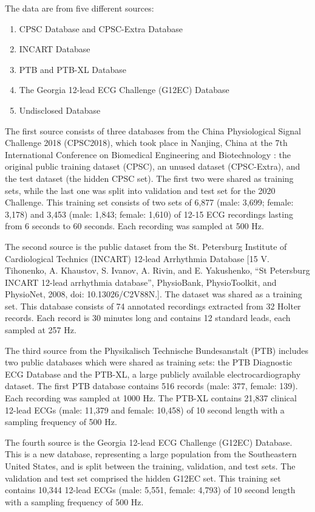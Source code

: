 The data are from five different sources:
\begin{enumerate}
    \item CPSC Database and CPSC-Extra Database
    \item INCART Database
    \item PTB and PTB-XL Database
    \item The Georgia 12-lead ECG Challenge (G12EC) Database 
    \item Undisclosed Database
\end{enumerate}

The first source consists of three databases from the China Physiological Signal Challenge 2018 (CPSC2018), which took place in Nanjing, China at the 7th International Conference on Biomedical Engineering and Biotechnology \cite{dataset2}: the original public training dataset (CPSC), an unused dataset (CPSC-Extra), and the test dataset (the hidden CPSC set). The first two were shared as training sets, while the last one was split into validation and test set for the 2020 Challenge. This training set consists of two sets of 6,877 (male: 3,699; female: 3,178) and 3,453 (male: 1,843; female: 1,610) of 12-15 ECG recordings lasting from 6 seconds to 60 seconds. Each recording was sampled at 500 Hz.

The second source is the public dataset from the St. Petersburg Institute of Cardiological Technics (INCART) 12-lead Arrhythmia Database [15 V. Tihonenko, A. Khaustov, S. Ivanov, A. Rivin, and E. Yakushenko, “St Petersburg INCART 12-lead arrhythmia database”, PhysioBank, PhysioToolkit, and PhysioNet, 2008, doi: 10.13026/C2V88N.]. The dataset was shared as a training set. This database consists of 74 annotated recordings extracted from 32 Holter records. Each record is 30 minutes long and contains 12 standard leads, each sampled at 257 Hz.

The third source from the Physikalisch Technische Bundesanstalt (PTB) includes two public databases which were shared as training sets: the PTB Diagnostic ECG Database and the PTB-XL, a large publicly available electrocardiography dataset. The first PTB database contains 516 records (male: 377, female: 139). Each recording was sampled at 1000 Hz. The PTB-XL contains 21,837 clinical 12-lead ECGs (male: 11,379 and female: 10,458) of 10 second length with a sampling frequency of 500 Hz.


The fourth source is the Georgia 12-lead ECG Challenge (G12EC) Database. This is a new database, representing a large population from the Southeastern United States, and is split between the training, validation, and test sets. The validation and test set comprised the hidden G12EC set. This training set contains 10,344 12-lead ECGs (male: 5,551, female: 4,793) of 10 second length with a sampling frequency of 500 Hz.

